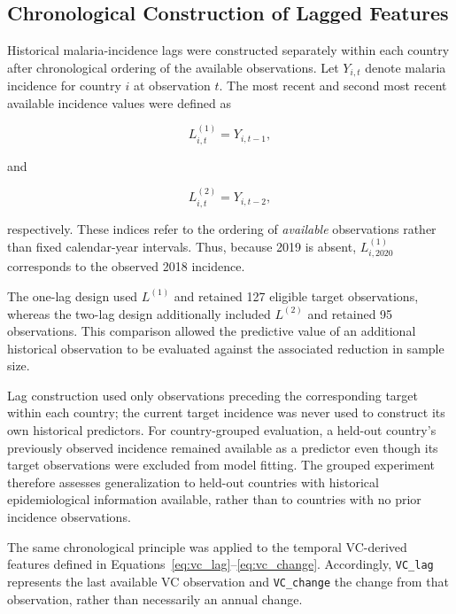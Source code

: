 \documentclass[10pt,twocolumn]{article}
\begin{document}
\subsection{Chronological Construction of Lagged Features}

Historical malaria-incidence lags were constructed separately within
each country after chronological ordering of the available
observations. Let \(Y_{i,t}\) denote malaria incidence for country
\(i\) at observation \(t\). The most recent and second most recent
available incidence values were defined as

\begin{equation}
L^{(1)}_{i,t}=Y_{i,t-1},
\label{eq:incidence_lag1}
\end{equation}

and

\begin{equation}
L^{(2)}_{i,t}=Y_{i,t-2},
\label{eq:incidence_lag2}
\end{equation}

respectively. These indices refer to the ordering of \emph{available}
observations rather than fixed calendar-year intervals. Thus, because
2019 is absent, \(L^{(1)}_{i,2020}\) corresponds to the observed 2018
incidence.

The one-lag design used \(L^{(1)}\) and retained 127 eligible target
observations, whereas the two-lag design additionally included
\(L^{(2)}\) and retained 95 observations. This comparison allowed the
predictive value of an additional historical observation to be
evaluated against the associated reduction in sample size.

Lag construction used only observations preceding the corresponding
target within each country; the current target incidence was never
used to construct its own historical predictors. For country-grouped
evaluation, a held-out country's previously observed incidence
remained available as a predictor even though its target observations
were excluded from model fitting. The grouped experiment therefore
assesses generalization to held-out countries with historical
epidemiological information available, rather than to countries with
no prior incidence observations.

The same chronological principle was applied to the temporal
VC-derived features defined in
Equations~\ref{eq:vc_lag}--\ref{eq:vc_change}. Accordingly,
\texttt{VC\_lag} represents the last available VC observation and
\texttt{VC\_change} the change from that observation, rather than
necessarily an annual change.
\end{document}

